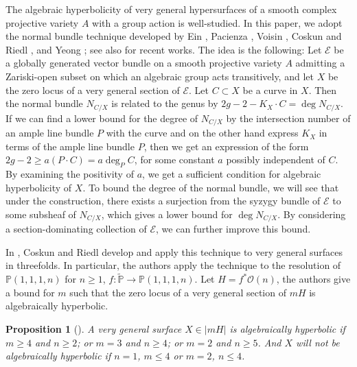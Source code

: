 \documentclass{amsart}
\newtheorem{proposition}[theorem]{Proposition}
\theoremstyle{definition}
\theoremstyle{remark}
\begin{document}
The algebraic hyperbolicity of very general hypersurfaces of a smooth complex projective  variety $A$ with a group action is well-studied. In this paper, we adopt the normal bundle technique developed by Ein \cite{Ein1988, Ein1991}, Pacienza \cite{Pacienza2003}, Voisin \cite{Voisin1996, Voisin1998}, Coskun and Riedl \cite{CoskunRiedl2019,coskun2019algebraichyperbolicitygeneralsurfaces}, and Yeong \cite{yeong2022algebraichyperbolicitygeneralhypersurfaces}; see also \cite{mioranci2025algebraichyperbolicitygeneralhypersurfaces,moraga2025hyperbolicityconjectureadjointbundles} for recent works. The idea is the following: Let $\mathcal E$ be a globally generated vector bundle on a smooth projective variety $A$ admitting a Zariski-open subset on which an algebraic group acts transitively, and let $X$ be the zero locus of a very general section of $\mathcal E$. Let $C \subset X$ be a curve in $X$. Then the normal bundle $N_{C/X}$ is related to the genus by $2g-2-K_X \cdot C = \deg N_{C/X}$. If we can find a lower bound for the degree of $N_{C/X}$ by the intersection number of an ample line bundle $P$ with the curve and on the other hand express $K_X$ in terms of the ample line bundle $P$, then we get an expression of the form $2g-2 \geq a (P \cdot C) = a \deg_P C$, for some constant $a$ possibly independent of $C$. By examining the positivity of $a$, we get a sufficient condition for algebraic hyperbolicity of $X$. To bound the degree of the normal bundle, we will see that under the construction, there exists a surjection from the syzygy bundle of $\mathcal E$ to some subsheaf of $N_{C/X}$, which gives a lower bound for $\deg N_{C/X}$. By considering a section-dominating collection of $\mathcal E$, we can further improve this bound.

In \cite{coskun2019algebraichyperbolicitygeneralsurfaces}, Coskun and Riedl develop and apply this technique to very general surfaces in threefolds. In particular, the authors apply the technique to the resolution of $\mathbb{P}(1,1,1,n)$ for $n\geq1$, $f:\widetilde{\mathbb{P}} \to \mathbb{P}(1,1,1,n)$. Let $H = f^*\mathcal{O}(n)$, the authors give a bound for $m$ such that the zero locus of a very general section of $mH$ is algebraically hyperbolic.

\begin{proposition}[{\cite[Lemma 3.9, Proposition 3.10]{coskun2019algebraichyperbolicitygeneralsurfaces}}]
A very general surface $X \in |mH|$ is algebraically hyperbolic if $m \geq 4$ and $n \geq 2$; or $m = 3$ and $n \geq 4$; or $m = 2$ and $n \geq 5$. And $X$ will not be algebraically hyperbolic if $n = 1$, $m\leq4$ or $m = 2$, $n \leq 4$.
\end{proposition}
\end{document}
